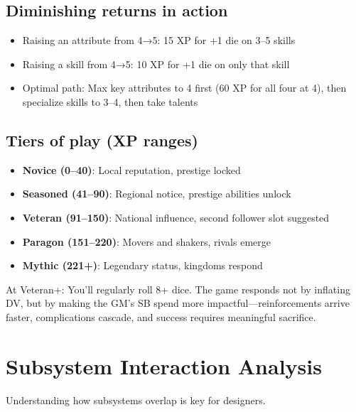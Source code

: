 \documentclass[11pt]{article}
\begin{document}
\subsection{Diminishing returns in action}
\begin{itemize}
    \item Raising an attribute from 4→5: 15 XP for +1 die on 3–5 skills
    \item Raising a skill from 4→5: 10 XP for +1 die on only that skill
    \item Optimal path: Max key attributes to 4 first (60 XP for all four at 4), then specialize skills to 3–4, then take talents
\end{itemize}

\subsection{Tiers of play (XP ranges)}
\begin{itemize}
    \item \textbf{Novice (0–40)}: Local reputation, prestige locked
    \item \textbf{Seasoned (41–90)}: Regional notice, prestige abilities unlock
    \item \textbf{Veteran (91–150)}: National influence, second follower slot suggested
    \item \textbf{Paragon (151–220)}: Movers and shakers, rivals emerge
    \item \textbf{Mythic (221+)}: Legendary status, kingdoms respond
\end{itemize}

At Veteran+: You'll regularly roll 8+ dice. The game responds not by inflating DV, but by making the GM's SB spend more impactful—reinforcements arrive faster, complications cascade, and success requires meaningful sacrifice.

\section{Subsystem Interaction Analysis}
\label{sec:subsystem-interaction}

Understanding how subsystems overlap is key for designers.
\end{document}
